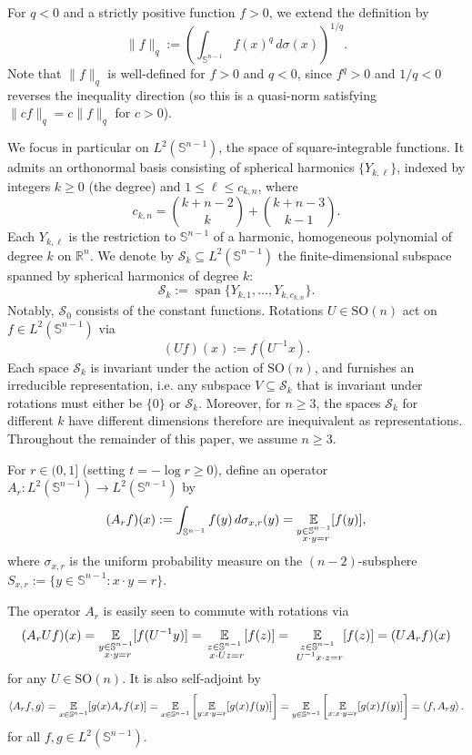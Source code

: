 \documentclass[11pt]{article}
\newcommand{\inner}[1]{\left\langle{#1}\right\rangle}
\newcommand{\E}{\mathop{\mathbb E\/}}
\newcommand{\sn}{{\mathbb{S}^{n-1} }}
\newcommand{\sk}{{\mathcal{S}_k }}
\begin{document}
For $q < 0$ and a strictly positive function $f > 0$, we extend the definition by
\[
\|f\|_q := \left( \int_{\mathbb{S}^{n-1}} f(x)^q \, d\sigma(x) \right)^{1/q}.
\]
Note that $\|f\|_q$ is well-defined for $f > 0$ and $q < 0$, since $f^q > 0$ and $1/q < 0$ reverses the inequality direction (so this is a quasi-norm satisfying $\|cf\|_q = c\|f\|_q$ for $c > 0$).

\smallskip
We focus in particular on $L^2(\mathbb{S}^{n-1})$, the space of square-integrable functions. It admits an orthonormal basis consisting of spherical harmonics $\{Y_{k,\ell}\}$, indexed by integers $k \geq 0$ (the degree) and $1 \leq \ell \leq c_{k,n}$, where
\[
c_{k,n} = \binom{k+n-2}{k} + \binom{k+n-3}{k-1}.
\]
Each $Y_{k,\ell}$ is the restriction to $\mathbb{S}^{n-1}$ of a harmonic, homogeneous polynomial of degree $k$ on $\mathbb{R}^n$. We denote by $\mathcal{S}_k \subseteq L^2(\mathbb{S}^{n-1})$ the finite-dimensional subspace spanned by spherical harmonics of degree $k$:
\[
\mathcal{S}_k := \operatorname{span} \{ Y_{k,1}, \dotsc, Y_{k,c_{k,n}} \}.
\]
Notably, $\mathcal{S}_0$ consists of the constant functions. Rotations $U \in \mathrm{SO}(n)$ act on $f \in L^2(\mathbb{S}^{n-1})$ via
\[
(Uf)(x) := f(U^{-1}x).
\]
Each space $\mathcal{S}_k$ is invariant under the action of $\mathrm{SO}(n)$, and furnishes an irreducible representation, i.e. any subspace $V\subseteq\sk$ that is invariant under rotations must either be $\{0\}$ or $\sk$. Moreover, for $n \geq 3$, the spaces $\mathcal{S}_k$ for different $k$ have different dimensions therefore are inequivalent as representations. Throughout the remainder of this paper, we assume $n \geq 3$.

\smallskip
For $r \in (0,1]$ (setting $t = -\log r \geq 0$), define an operator $A_r : L^2(\mathbb{S}^{n-1}) \to L^2(\mathbb{S}^{n-1})$ by
\[
(A_r f)(x) := \int_{\mathbb{S}^{n-1}} f(y) \, d\sigma_{x,r}(y) = \E_{\substack{y\in \sn\\\  x \cdot y = r}} [f(y)],
\]
where $\sigma_{x,r}$ is the uniform probability measure on the $(n-2)$-subsphere $S_{x,r}:=\{ y \in \mathbb{S}^{n-1} : x \cdot y = r \}$.

The operator $A_r$ is easily seen to commute with rotations via
$$(A_r U f)(x)=\E_{\substack{y\in \sn\\\  x \cdot y = r}} [f(U^{-1}y)]=\E_{\substack{z\in \sn\\\  x \cdot Uz = r}} [f(z)]=\E_{\substack{z\in \sn\\\  U^{-1}x \cdot z = r}} [f(z)]=(UA_rf)(x)$$
for any $U\in \mathrm{SO}(n)$.
It is also self-adjoint by
$$\inner{A_r f,g}=\E_{x\in \sn}[g(x)A_rf(x)]=\E_{x\in \sn}\left[\E_{y:x\cdot y=r}[g(x)f(y)]\right]=\E_{y\in \sn}\left[\E_{x:x\cdot y=r}[g(x)f(y)]\right]=\inner{f,A_r g}.$$
for all $f,g \in L^2(\mathbb{S}^{n-1})$.
\end{document}
